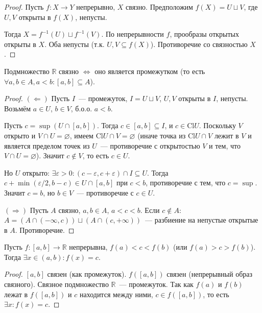 \documentclass[12pt]{article}
\newcommand{\Cl}{\text{Cl}}
\begin{document}
	\begin{proof}
		Пусть $f: X \to Y$ непрерывно, $X$ связно. Предположим $f(X) = U \sqcup V$, где $U, V$ открыты в $f(X)$, непусты.
		
		Тогда $X = f^{-1}(U) \sqcup f^{-1}(V)$. По непрерывности $f$, прообразы открытых открыты в $X$. Оба непусты (т.к. $U, V \subseteq f(X)$). Противоречие со связностью $X$.
	\end{proof}
	
	\begin{theorem}
		Подмножество $\mathbb{R}$ связно $\Leftrightarrow$ оно является промежутком (то есть $\forall a, b \in A, a < b: [a, b] \subseteq A$).
	\end{theorem}
	
	\begin{proof}
		$(\Leftarrow)$ Пусть $I$~--- промежуток, $I = U \sqcup V$, $U, V$ открыты в $I$, непусты. Возьмём $a \in U$, $b \in V$, б.о.о. $a < b$.
		
		Пусть $c = \sup(U \cap [a, b])$. Тогда $c \in [a, b] \subseteq I$, и $c \in \Cl U$. Поскольку $V$ открыто и $V \cap U = \varnothing$, имеем $\Cl U \cap V = \varnothing$ (иначе точка из $\Cl U \cap V$ лежит в $V$ и является пределом точек из $U$~--- противоречие с открытостью $V$ и тем, что $V \cap U = \varnothing$). Значит $c \notin V$, то есть $c \in U$.
		
		Но $U$ открыто: $\exists \varepsilon > 0: (c - \varepsilon, c + \varepsilon) \cap I \subseteq U$. Тогда $c + \min(\varepsilon/2, b - c) \in U \cap [a, b]$ при $c < b$, противоречие с тем, что $c = \sup$. Значит $c = b$, но $b \in V$~--- противоречие с $c \in U$.
		
		$(\Rightarrow)$ Пусть $A$ связно, $a, b \in A$, $a < c < b$. Если $c \notin A$:
		$A = (A \cap (-\infty, c)) \sqcup (A \cap (c, +\infty))$~--- разбиение на непустые открытые в $A$. Противоречие.
	\end{proof}
	
	\begin{theorem}
		Пусть $f: [a, b] \to \mathbb{R}$ непрерывна, $f(a) < c < f(b)$ (или $f(a) > c > f(b)$). Тогда $\exists x \in (a, b): f(x) = c$.
	\end{theorem}
	
	\begin{proof}
		$[a, b]$ связен (как промежуток). $f([a, b])$ связен (непрерывный образ связного). Связное подмножество $\mathbb{R}$~--- промежуток. Так как $f(a)$ и $f(b)$ лежат в $f([a, b])$ и $c$ находится между ними, $c \in f([a, b])$, то есть $\exists x: f(x) = c$.
	\end{proof}
	
\end{document}
